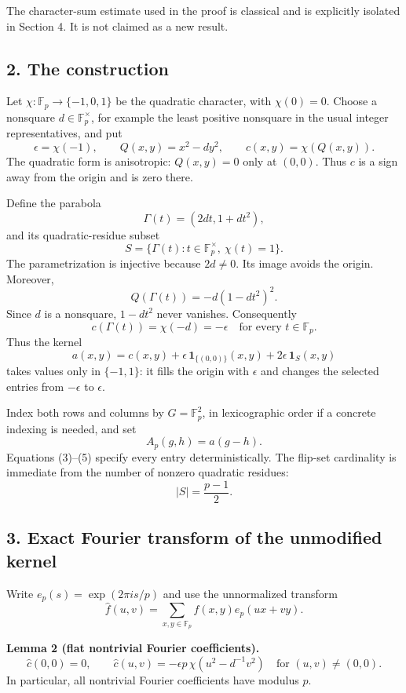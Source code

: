 \documentclass[
  11pt,
]{article}
\begin{document}
The character-sum estimate used in the proof is classical and is
explicitly isolated in Section 4. It is not claimed as a new result.

\subsection{2. The construction}\label{the-construction}

Let \(\chi:\mathbb F_p\to\{-1,0,1\}\) be the quadratic character, with
\(\chi(0)=0\). Choose a nonsquare \(d\in\mathbb F_p^\times\), for
example the least positive nonsquare in the usual integer
representatives, and put \[
\epsilon=\chi(-1),\qquad Q(x,y)=x^2-dy^2,
\qquad c(x,y)=\chi(Q(x,y)).
\] The quadratic form is anisotropic: \(Q(x,y)=0\) only at \((0,0)\).
Thus \(c\) is a sign away from the origin and is zero there.

Define the parabola \[
\Gamma(t)=(2dt,1+dt^2),
\] and its quadratic-residue subset \[
S=\{\Gamma(t):t\in\mathbb F_p^\times,\ \chi(t)=1\}. \tag{3}
\] The parametrization is injective because \(2d\ne0\). Its image avoids
the origin. Moreover, \[
Q(\Gamma(t))=-d(1-dt^2)^2.
\] Since \(d\) is a nonsquare, \(1-dt^2\) never vanishes. Consequently
\[
c(\Gamma(t))=\chi(-d)=-\epsilon
\quad\text{for every }t\in\mathbb F_p.
\] Thus the kernel \[
a(x,y)=c(x,y)+\epsilon\,\mathbf1_{\{(0,0)\}}(x,y)
       +2\epsilon\,\mathbf1_S(x,y) \tag{4}
\] takes values only in \(\{-1,1\}\): it fills the origin with
\(\epsilon\) and changes the selected entries from \(-\epsilon\) to
\(\epsilon\).

Index both rows and columns by \(G=\mathbb F_p^2\), in lexicographic
order if a concrete indexing is needed, and set \[
A_p(g,h)=a(g-h). \tag{5}
\] Equations (3)--(5) specify every entry deterministically. The
flip-set cardinality is immediate from the number of nonzero quadratic
residues: \[
|S|=\frac{p-1}{2}. \tag{6}
\]

\subsection{3. Exact Fourier transform of the unmodified
kernel}\label{exact-fourier-transform-of-the-unmodified-kernel}

Write \(e_p(s)=\exp(2\pi i s/p)\) and use the unnormalized transform \[
\widehat f(u,v)=\sum_{x,y\in\mathbb F_p}f(x,y)e_p(ux+vy).
\]

\textbf{Lemma 2 (flat nontrivial Fourier coefficients).} \[
\widehat c(0,0)=0,
\qquad
\widehat c(u,v)=-\epsilon p\,\chi(u^2-d^{-1}v^2)
\quad\text{for }(u,v)\ne(0,0). \tag{7}
\] In particular, all nontrivial Fourier coefficients have modulus
\(p\).
\end{document}
